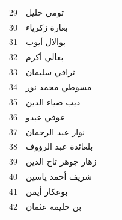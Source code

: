 \documentclass[12pt, a4paper]{article}
\begin{document}
\begin{longtable}{|c|p{}|p{}|c|}
    29 & تومي خليل & \hrulefill & \\
    30 & بعارة زكرياء & \hrulefill & \\
    31 & بوالال أيوب & \hrulefill & \\
    32 & بعالي أكرم & \hrulefill & \\
    33 & ثرافي سليمان & \hrulefill & \\
    34 & مسوطي محمد نور & \hrulefill & \\
    35 & ديب ضياء الدين & \hrulefill & \\
    36 & عوفي عبدو & \hrulefill & \\
    37 & نوار عبد الرحمان & \hrulefill & \\
    38 & بلعائدة عبد الرؤوف & \hrulefill & \\
    39 & زهار جوهر تاج الدين & \hrulefill & \\
    40 & شريف أحمد ياسين & \hrulefill & \\
    41 & بوعكاز أيمن & \hrulefill & \\
    42 & بن حليمة عثمان & \hrulefill & \\
\end{longtable}
\end{document}

